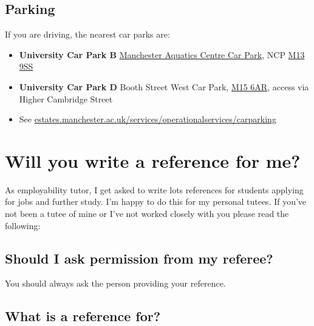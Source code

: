 \documentclass[
  12pt,
]{book}
\providecommand{\tightlist}{%
  \setlength{\itemsep}{0pt}\setlength{\parskip}{0pt}}
\begin{document}
\hypertarget{parking}{%
\section{Parking}\label{parking}}

If you are driving, the nearest car parks are:

\begin{itemize}
\tightlist
\item
  \textbf{University Car Park B} \href{https://www.ncp.co.uk/find-a-car-park/car-parks/manchester-aquatic-centre-jv/}{Manchester Aquatics Centre Car Park}, NCP \href{http://maps.google.co.uk/maps?q=M13+9SS}{M13 9SS}
\item
  \textbf{University Car Park D} Booth Street West Car Park, \href{http://maps.google.co.uk/maps?q=M15+6AR}{M15 6AR}, access via Higher Cambridge Street
\item
  See \href{https://www.estates.manchester.ac.uk/services/operationalservices/carparking/}{estates.manchester.ac.uk/services/operationalservices/carparking}
\end{itemize}

\hypertarget{appendix-appendix}{%
\appendix}


\hypertarget{referee}{%
\chapter{Will you write a reference for me?}\label{referee}}

As employability tutor, I get asked to write lots references for students applying for jobs and further study. I'm happy to do this for my personal tutees. If you've not been a tutee of mine or I've not worked closely with you please read the following:

\hypertarget{should-i-ask-permission-from-my-referee}{%
\section{Should I ask permission from my referee?}\label{should-i-ask-permission-from-my-referee}}

You should always ask the person providing your reference.

\hypertarget{what-is-a-reference-for}{%
\section{What is a reference for?}\label{what-is-a-reference-for}}
\end{document}
